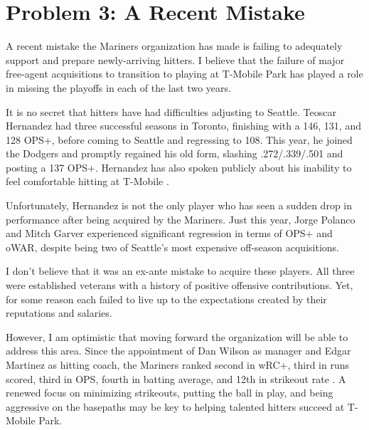 
\section*{Problem 3: A Recent Mistake}
\label{sec:p3}

A recent mistake the Mariners organization has made is failing to adequately support and prepare newly-arriving hitters. I believe that the failure of major free-agent acquisitions to transition to playing at T-Mobile Park has played a role in missing the playoffs in each of the last two years.

It is no secret that hitters have had difficulties adjusting to Seattle. Teoscar Hernandez had three successful seasons in Toronto, finishing with a 146, 131, and 128 OPS+, before coming to Seattle and regressing to 108. This year, he joined the Dodgers and promptly regained his old form, slashing .272/.339/.501 and posting a 137 OPS+. Hernandez has also spoken publicly about his inability to feel comfortable hitting at T-Mobile \cite{hereth}.

Unfortunately, Hernandez is  not the only player who has seen a sudden drop in performance after being acquired by the Mariners. Just this year, Jorge Polanco and Mitch Garver experienced significant regression in terms of OPS+ and oWAR, despite being two of Seattle's most expensive off-season acquisitions.

I don't believe that it was an ex-ante mistake to acquire these players. All three were established veterans with a history of positive offensive contributions. Yet, for some reason each failed to live up to the expectations created by their reputations and salaries.

However, I am optimistic that moving forward the organization will be able to address this area. Since the appointment of Dan Wilson as manager and Edgar Martinez as hitting coach, the Mariners ranked second in wRC+, third in runs scored, third in OPS, fourth in batting average, and 12th in strikeout rate \cite{kramer}. A renewed focus on minimizing strikeouts, putting the ball in play, and being aggressive on the basepaths may be key to helping talented hitters succeed at T-Mobile Park.